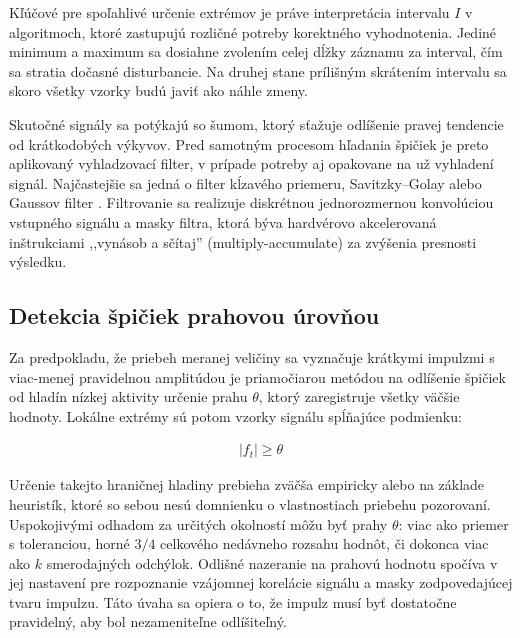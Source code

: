 Kľúčové pre spoľahlivé určenie extrémov je práve interpretácia intervalu $I$ v algoritmoch, ktoré zastupujú rozličné
potreby korektného vyhodnotenia. Jediné minimum a maximum sa dosiahne zvolením celej dĺžky záznamu za interval, čím sa
stratia dočasné disturbancie. Na druhej stane prílišným skrátením intervalu sa skoro všetky vzorky budú javiť ako náhle zmeny.

Skutočné signály sa potýkajú so šumom, ktorý sťažuje odlíšenie pravej tendencie od krátkodobých výkyvov.
Pred samotným procesom hľadania špičiek je preto aplikovaný vyhladzovací filter, v prípade potreby aj opakovane na už
vyhladení signál. Najčastejšie sa jedná o filter
kĺzavého priemeru, Savitzky–Golay alebo Gaussov filter \cite{spectrometry-peak-detection}. Filtrovanie sa realizuje
diskrétnou jednorozmernou konvolúciou vstupného signálu a masky filtra, ktorá býva hardvérovo akcelerovaná inštrukciami ,,vynásob a sčítaj''
(multiply-accumulate) za zvýšenia presnosti výsledku.

\subsection{Detekcia špičiek prahovou úrovňou}
Za predpokladu, že priebeh meranej veličiny sa vyznačuje krátkymi impulzmi s viac-menej pravidelnou amplitúdou
je priamočiarou metódou na odlíšenie špičiek od hladín nízkej aktivity určenie prahu $\theta$, ktorý zaregistruje
všetky väčšie hodnoty. Lokálne extrémy sú potom vzorky signálu spĺňajúce podmienku:
\begin{ceqn}\begin{align}
|f_t| \geq \theta
\end{align}\end{ceqn}

Určenie takejto hraničnej hladiny prebieha zväčša empiricky alebo na základe heuristík, ktoré so sebou nesú
domnienku o vlastnostiach priebehu pozorovaní. Uspokojivými odhadom za určitých okolností môžu byť prahy $\theta$:
viac ako priemer s toleranciou, horné $3/4$ celkového nedávneho rozsahu hodnôt, či dokonca viac ako $k$
smerodajných odchýlok. Odlišné nazeranie na prahovú hodnotu spočíva v jej nastavení pre rozpoznanie
vzájomnej korelácie signálu a masky zodpovedajúcej tvaru impulzu. Táto úvaha sa opiera o to, že impulz
musí byť dostatočne pravidelný, aby bol nezameniteľne odlíšiteľný.


